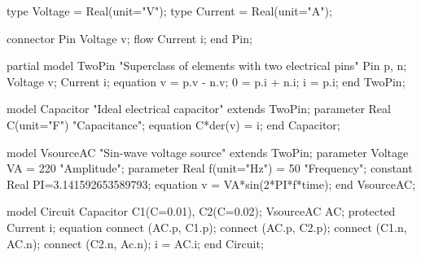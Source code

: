 \begin{boxedverbatim}
type Voltage = Real(unit="V");
type Current = Real(unit="A");

connector Pin 
  Voltage      v;
  flow Current i;
end Pin;

partial model TwoPin "Superclass of elements with two electrical pins" 
  Pin p, n;
  Voltage v;
  Current i;
equation
  v = p.v - n.v;
  0 = p.i + n.i; 
  i = p.i;
end TwoPin;

model Capacitor "Ideal electrical capacitor" 
  extends TwoPin;
  parameter Real C(unit="F") "Capacitance";
equation 
  C*der(v) = i;
end Capacitor;

model VsourceAC "Sin-wave voltage source" 
  extends TwoPin;
  parameter Voltage VA = 220 "Amplitude";
  parameter Real f(unit="Hz") = 50  "Frequency";
  constant  Real PI=3.141592653589793;  
equation 
  v = VA*sin(2*PI*f*time);
end VsourceAC;

model Circuit
  Capacitor  C1(C=0.01), C2(C=0.02);
  VsourceAC AC;
protected
  Current i;
equation
  connect (AC.p, C1.p);
  connect (AC.p, C2.p);
  connect (C1.n, AC.n);
  connect (C2.n, Ac.n);
  i = AC.i;
end Circuit;
\end{boxedverbatim}
